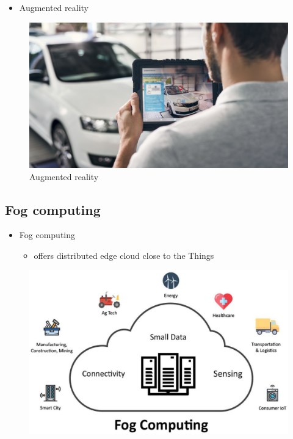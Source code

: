\documentclass{beamer}
\begin{document}
\begin{frame}
\begin{itemize}
	\item Augmented reality
\end{itemize}	
\begin{figure}
	\centering
	\includegraphics[width=0.7\linewidth]{agmented_R}
	\caption{Augmented reality}
	\label{fig:agmentedr}
\end{figure}
\end{frame}
\subsection{Fog computing}
\begin{frame}
	\begin{itemize}
		\item Fog computing
		\begin{itemize}
			\item<1-> {offers distributed
				edge cloud close to the Things}
		\end{itemize}
	\end{itemize}
\begin{figure}
	\centering
	\includegraphics[width=0.7\linewidth]{fog-computing}
	\label{fig:fog-computing}
\end{figure}

\end{frame}
\end{document}
